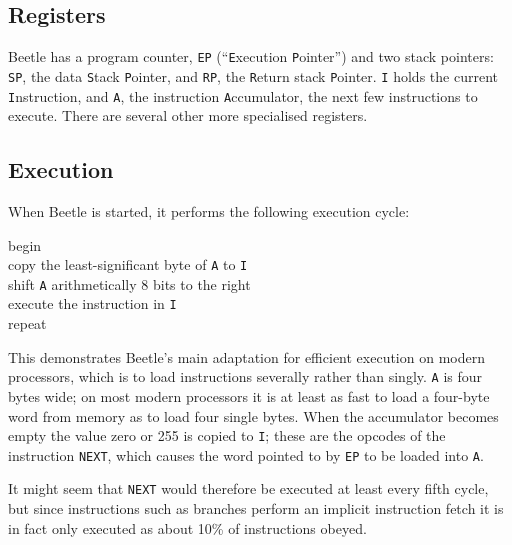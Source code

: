 \documentclass{article}
\newcommand{\conc}[1]{\texttt{\textup{#1}}}
\begin{document}
\subsection{Registers}

Beetle has a program counter, \conc{EP} (``\conc{E}xecution \conc{P}ointer'')
and two stack pointers: \conc{SP}, the data \conc{S}tack \conc{P}ointer, and
\conc{RP}, the \conc{R}eturn stack \conc{P}ointer. \conc{I} holds the current
\conc{I}nstruction, and \conc{A}, the instruction \conc{A}ccumulator, the
next few instructions to execute. There are several other more specialised
registers.


\subsection{Execution}

When Beetle is started, it performs the following execution cycle:

\begin{it}
\begin{tabbing}
\hspace{0.5in}begin\\
\hspace{0.75in}copy the least-significant byte of \conc{A} to \conc{I}\\
\hspace{0.75in}shift \conc{A} arithmetically 8 bits to the right\\
\hspace{0.75in}execute the instruction in \conc{I}\\
\hspace{0.5in}repeat
\end{tabbing}
\end{it}

\noindent This demonstrates Beetle's main adaptation for efficient execution
on modern pro\-cessors, which is to load instructions severally rather than
singly. \conc{A} is four bytes wide; on most modern processors it is at least
as fast to load a four-byte word from memory as to load four single bytes.
When the accumulator becomes empty the value zero or 255 is copied to
\conc{I}; these are the opcodes of the instruction \conc{NEXT}, which causes
the word pointed to by \conc{EP} to be loaded into \conc{A}.

It might seem that \conc{NEXT} would therefore be executed at least every
fifth cycle, but since instructions such as branches perform an implicit
instruction fetch it is in fact only executed as about 10\% of instructions
obeyed.
\end{document}
